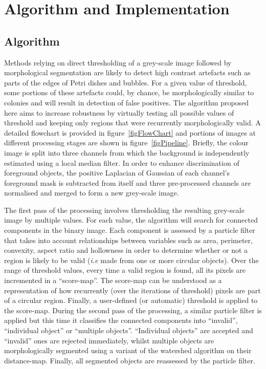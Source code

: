 \documentclass[10pt]{article}
\begin{document}
\section*{Algorithm and Implementation}

\subsection*{Algorithm} 
Methods relying on direct thresholding of a grey-scale image followed
by morphological segmentation are likely to detect high contrast artefacts such
as parts of the edges of Petri dishes and bubbles.  For a given value of threshold,
some portions of these artefacts could, by chance, be morphologically similar to colonies and will result in
detection of false positives.
The algorithm proposed here aims to increase robustness by virtually testing
all possible values of threshold and keeping only regions that were recurrently morphologically
valid. A detailed flowchart is provided in figure~\ref{figFlowChart} and portions of images 
at different processing stages are shown in figure~\ref{figPipeline}.
Briefly, the colour image is split into three channels from which the background
is independently estimated using a local median filter.
In order to enhance discrimination of foreground objects,  the positive
Laplacian of Gaussian of each channel's foreground mask is subtracted from
itself and three pre-processed channels are normalised and merged to form a
new grey-scale image.

The first pass of the processing involves thresholding the resulting grey-scale
image by multiple values.
For each value, the algorithm will search for connected components in the binary
image.
Each component is assessed by a particle filter that takes into account relationships
between variables such as area, perimeter, convexity, aspect ratio and
hollowness in order to determine whether or not a region is likely to be valid 
(\emph{i.e} made from one or more circular objects).
Over the range of threshold values, every time a valid region is found, all
its pixels are incremented in a ``score-map''.
The score-map can be understood as a representation of how recurrently (over the
iterations of threshold) pixels are part of a circular region. Finally,  a
user-defined (or automatic) threshold is applied to the score-map.
During the second pass of the processing, a similar particle filter is applied
but this time it classifies the connected components into ``invalid'',
``individual object'' or ``multiple objects''.
``Individual objects'' are accepted and ``invalid'' ones  are rejected
immediately, whilst multiple objects are morphologically segmented using a variant
of the watershed algorithm on their distance-map\cite{marotz_effective_2001}.
Finally, all segmented objects are reassessed by the particle filter.
\end{document}
